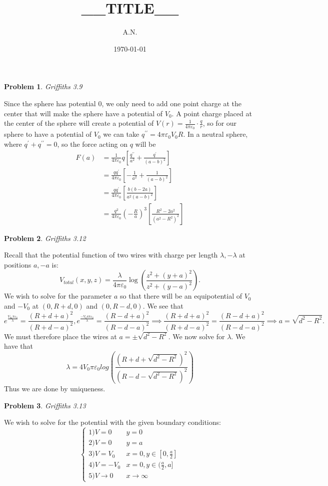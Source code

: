 \documentclass[12pt, a4paper]{article}
\title{__TITLE__}
\author{A.N.}
\date{\today}
\newtheorem{problem}{Problem}
\theoremstyle{definition}
\newcommand{\ep}{\varepsilon}
\begin{document}
\begin{problem}
	Griffiths 3.9
\end{problem}
Since the sphere has potential $0$, we only need to add one point charge at the center that will make the sphere have a potential of $V_0$. A point charge placed at the center of the sphere will create a potential of $V(r) = \frac{1}{4\pi\ep_0} \cdot \frac{q}{r}$, so for 
our sphere to have a potential of $V_0$ we can take $q^{\prime \prime} = 4\pi \ep_0 V_0 R$. 
In a neutral sphere, where $q^\prime + q^{\prime \prime}=0 $, so the force acting on $q$ will be 
\begin{align*}
	F(a)& = \frac{1}{4\pi \ep_0} q \left[ \frac{q^{\prime \prime}}{a^2} + \frac{q^\prime}{(a-b)^2} \right]
	\\ & = \frac{qq^\prime}{4\pi \ep_0} \left[ -\frac{1}{a^2} + \frac{1}{(a-b)^2}  \right]
	\\ & = \frac{qq^\prime}{4\pi \ep_0} \left[ \frac{b(b-2a)}{a^2(a-b)^2} \right]
	\\ & = \frac{q^2}{4\pi \ep_0} \left(- \frac{R}{a} \right)^3  \left[ \frac{R^2-2a^2}{(a^2-R^2)^2} \right]
\end{align*}
\newpage
\begin{problem}
	Griffiths 3.12
\end{problem}
Recall that the potential function of two wires with charge per length $\lambda, -\lambda$ at positions $a,-a$ is:
$$V_{total} (x,y,z) =  \frac{\lambda}{4\pi \ep_0}  \log  \left( \frac{z^2 + (y+a)^2}{z^2+(y-a)^2}  \right). $$
We wish to solve for the parameter $a$ so that there will be an equipotential of $V_0$ and $-V_0$ at
$(0,R+d,0)$ and $ (0,R-d,0)$. 
We see that
$$e^{\frac{V_04\pi \ep_0}{\lambda} } = \frac{(R+d+a)^2 }{(R+d-a)^2}, e^{\frac{-V_0 4\pi\ep_0}{\lambda }}  = \frac{(R-d+a)^2}{(R-d-a)^2} \implies \frac{(R+d+a)^2 }{(R+d-a)^2} = \frac{(R-d+a)^2}{(R-d-a)^2} \implies a=\sqrt{d^2-R^2}.   $$
We must therefore place the wires at $a = \pm \sqrt{d^2-R^2}$. We now solve for $\lambda$. 
We have that $$\lambda = 4V_0\pi\ep_0 log \left( \frac{(R+d + \sqrt{d^2-R^2})^2 }{(R-d-\sqrt{d^2-R^2})^2}  \right)$$
Thus we are done by uniqueness. 
\newpage
\begin{problem}
	Griffiths 3.13
\end{problem}
We wish to solve for the potential with the given boundary conditions: 
$$\begin{cases}
	1)V = 0 &  y=0\\
	2) V = 0 & y=a\\
	3) V = V_0 &  x=0, y\in [0, \frac{a}{2}]\\
	4) V = -V_0 & x=0 , y\in (\frac{a}{2}, a ]\\
	5) V \to 0 & x\to \infty
\end{cases}$$
\end{document}
